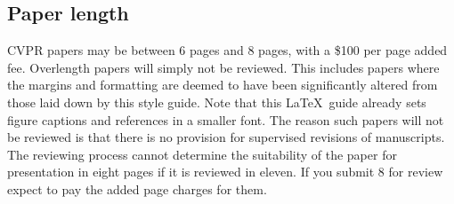 \documentclass[10pt,twocolumn,letterpaper]{article}
\begin{document}
\subsection{Paper length}
CVPR papers may be between 6 pages and 8 pages, with a \$100 per page added
fee.  Overlength papers will simply not be reviewed.  This includes papers
where the margins and formatting are deemed to have been significantly
altered from those laid down by this style guide.  Note that this
\LaTeX\ guide already sets figure captions and references in a smaller font.
The reason such papers will not be reviewed is that there is no provision for
supervised revisions of manuscripts.  The reviewing process cannot determine
the suitability of the paper for presentation in eight pages if it is
reviewed in eleven.  If you submit 8 for review expect to pay the added page
charges for them. 
\end{document}
